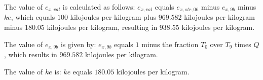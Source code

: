 The value of \( e_{x,val} \) is calculated as follows:
\( e_{x,val} \) equals \( e_{x,str,06} \) minus \( e_{x,9b} \) minus \( ke \), which equals \( 100 \) kilojoules per kilogram plus \( 969.582 \) kilojoules per kilogram minus \( 180.05 \) kilojoules per kilogram, resulting in \( 938.55 \) kilojoules per kilogram.

The value of \( e_{x,9b} \) is given by:
\( e_{x,9b} \) equals \( 1 \) minus the fraction \( T_0 \) over \( T_9 \) times \( Q \), which results in \( 969.582 \) kilojoules per kilogram.

The value of \( ke \) is:
\( ke \) equals \( 180.05 \) kilojoules per kilogram.